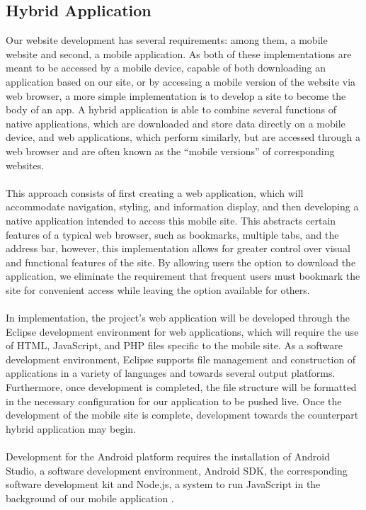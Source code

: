 \documentclass[letterpaper,10pt, draftclsnofoot,onecolumn]{IEEEtran}
\begin{document}
{{\subsection[Hybrid Application]{\noindent\color{black}
Hybrid Application}
{\noindent\color{black}
Our website development has several requirements: among them, a mobile website and second, a mobile application. 
As both of these implementations are meant to be accessed by a mobile device, capable of both downloading an application based on our site, or by accessing a mobile version of the website via web browser, a more simple implementation is to develop a site to become the body of an app. 
A hybrid application is able to combine several functions of native applications, which are downloaded and store data directly on a mobile device, and web applications, which perform similarly, but are accessed through a web browser and are often known as the “mobile versions” of corresponding websites.
\\ \\
This approach consists of first creating a web application, which will accommodate navigation, styling, and information display, and then developing a native application intended to access this mobile site. 
This abstracts certain features of a typical web browser, such as bookmarks, multiple tabs, and the address bar, however, this implementation allows for greater control over visual and functional features of the site. 
By allowing users the option to download the application, we eliminate the requirement that frequent users must bookmark the site for convenient access while leaving the option available for others.
\\ \\
In implementation, the project's web application will be developed through the Eclipse development environment for web applications, which will require the use of HTML, JavaScript, and PHP files specific to the mobile site. 
As a software development environment, Eclipse supports file management and construction of applications in a variety of languages and towards several output platforms. 
Furthermore, once development is completed, the file structure will be formatted in the necessary configuration for our application to be pushed live. 
Once the development of the mobile site is complete, development towards the counterpart hybrid application may begin.
\\ \\
Development for the Android platform requires the installation of Android Studio, a software development environment, Android SDK, the corresponding software development kit and Node.js, a system to run JavaScript in the background of our mobile application \cite{website0}. 
}}}
\end{document}
